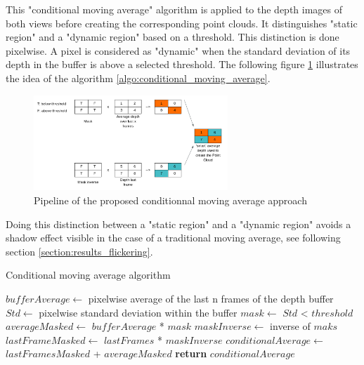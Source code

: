 This "conditional moving average" algorithm is applied to the depth images of both views before creating the corresponding point clouds. It distinguishes "static region" and a "dynamic region" based on a threshold. This distinction is done pixelwise. A pixel is considered as "dynamic" when the standard deviation of its depth in the buffer is above a selected threshold. The following figure \ref{figure:conditional_moving_average} illustrates the idea of the algorithm \ref{algo:conditional_moving_average}.

\begin{figure}[H]
    \centering
    \includegraphics[width=0.65\textwidth]{images/visual_enhancement/conditional_moving_average.png}
    \caption{Pipeline of the proposed conditionnal moving average approach}
    \label{figure:conditional_moving_average}
\end{figure}

Doing this distinction between a "static region" and a "dynamic region" avoids a shadow effect visible in the case of a traditional moving average, see following section \ref{section:results_flickering}.


\begin{algorithm}
    \caption{Conditional moving average algorithm}
    \label{algo:conditional_moving_average}
    \begin{algorithmic}[1] %
            \State $bufferAverage\gets$ pixelwise average of the last n frames of the depth buffer
            \State  $Std \gets$ pixelwise standard deviation within the buffer
            \State $mask\gets$ $Std$ < $threshold$ 
            \State $averageMasked\gets$ $bufferAverage$ * $mask$
            \State $maskInverse\gets$ inverse of $maks$
            \State $lastFrameMasked\gets$ $lastFrames$ * $maskInverse$
            \State $conditionalAverage\gets$ $lastFramesMasked$ + $averageMasked$
            \newline
            \State \textbf{return} $conditionalAverage$
        \EndProcedure
    \end{algorithmic}
\end{algorithm}


